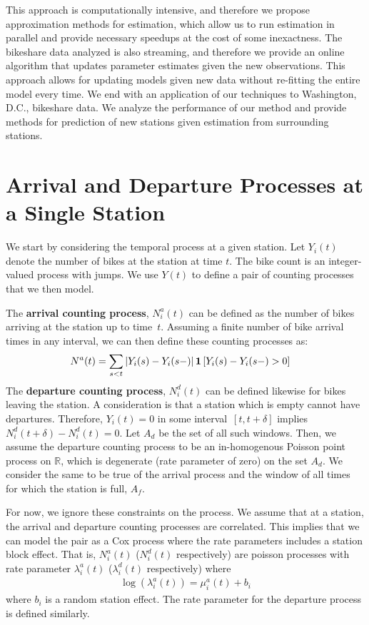 \documentclass{acm_proc_article-sp}
\begin{document}
This approach is computationally intensive, and therefore we propose approximation methods for estimation, which allow us to run estimation in parallel and provide necessary speedups at the cost of some inexactness.  The bikeshare data analyzed is also streaming, and therefore we provide an online algorithm that updates parameter estimates given the new observations.  This approach allows for updating models given new data without re-fitting the entire model every time.  We end with an application of our techniques to Washington, D.C., bikeshare data.  We analyze the performance of our method and provide methods for prediction of new stations given estimation from surrounding stations.


\section{Arrival and Departure Processes at a Single Station}

We start by considering the temporal process at a given station.  Let $Y_i (t)$ denote the number of bikes at the station at time $t$.  The bike count is an integer-valued process with jumps.  We use $Y(t)$ to define a pair of counting processes that we then model.

The {\bf arrival counting process}, $N_i^{a} (t)$ can be defined as the number of bikes arriving at the station up to time~$t$.  Assuming a finite number of bike arrival times in any interval, we can then define these counting processes as:
\begin{align}
N^{a} (t) &= \sum_{s < t} \left | Y_i (s) - Y_i (s-) \right | {\bf 1} \left[ Y_i (s) - Y_i (s-)  > 0 \right] 
\end{align}
The {\bf departure counting process}, $N_i^{d} (t)$ can be defined likewise for bikes leaving the station.  A consideration is that a station which is empty cannot have departures.  Therefore, $Y_i (t) = 0$ in some interval~$[t, t+\delta]$ implies $N_i^{d} (t+\delta) -N_i^{d} (t) = 0$.   Let $A_{d}$ be the set of all such windows.  Then, we assume the departure counting process to be an in-homogenous Poisson point process on $\mathbb{R}$, which is degenerate (rate parameter of zero) on the set $A_{d}$.  We consider the same to be true of the arrival process and the window of all times for which the station is full, $A_{f}$.

For now, we ignore these constraints on the process.  We assume that at a station, the arrival and departure counting processes are correlated.  This implies that we can model the pair as a Cox process where the rate parameters includes a station block effect. That is, $N_i^{a} (t)$ ($N_i^{d} (t)$ respectively) are poisson processes with rate parameter $\lambda_i^{a} (t)$ ($\lambda_i^{d} (t)$ respectively) where
\begin{align}
\log \left( \lambda_i^{a} (t) \right) = \mu^{a}_i(t) + b_i
\end{align}
\noindent where $b_i$ is a random station effect.  The rate parameter for the departure process is defined similarly.
\end{document}
